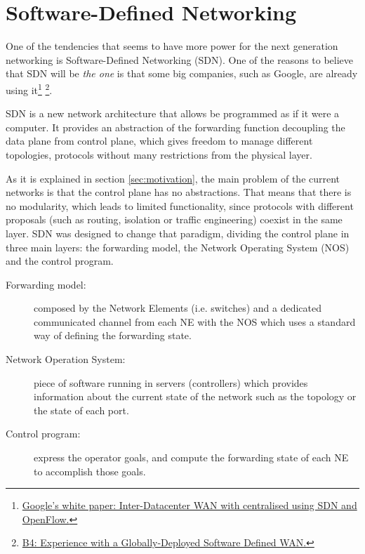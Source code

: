 \section{Software-Defined Networking}
\label{sec:sdn}

One of the tendencies that seems to have more power for the next generation networking is Software-Defined Networking (SDN). One of the reasons to believe that SDN will be \emph{the one} is that some big companies, such as Google, are already using it\footnote{\href{http://goo.gl/F6sBR}{Google's white paper: Inter-Datacenter WAN with centralised using SDN and OpenFlow.}} \footnote{\href{http://cseweb.ucsd.edu/~vahdat/papers/b4-sigcomm13.pdf}{B4: Experience with a Globally-Deployed Software Defined WAN.}}.

SDN is a new network architecture that allows be programmed as if it were a computer. It provides an abstraction of the forwarding function decoupling the data plane from control plane, which gives freedom to manage different topologies, protocols without many restrictions from the physical layer.

As it is explained in section \ref{sec:motivation}, the main problem of the current networks is that the control plane has no abstractions. That means that there is no modularity, which leads to limited functionality, since protocols with different proposals (such as routing, isolation or traffic engineering) coexist in the same layer. SDN was designed to change that paradigm, dividing the control plane in three main layers: the forwarding model, the Network Operating System (NOS) and the control program.

\begin{description}
\item[Forwarding model:] composed by the Network Elements (i.e. switches) and a dedicated communicated channel from each NE with the NOS which uses a standard way of defining the forwarding state.  
\item[Network Operation System:] piece of software running in servers (controllers) which provides information about the current state of the network such as the topology or the state of each port. 
\item[Control program:] express the operator goals, and compute the forwarding state of each NE to accomplish those goals.
\end{description}





